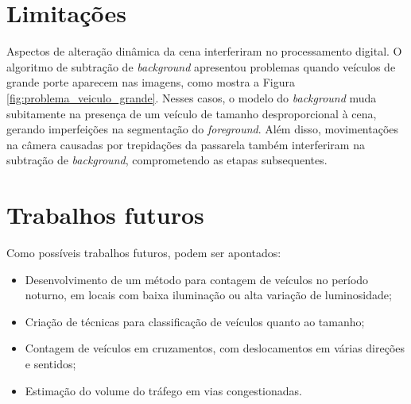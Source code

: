 
\section{Limitações} %
\label{sec:pontos_negativos_do_m_todo}

Aspectos de alteração dinâmica da cena interferiram no processamento digital. O algoritmo de subtração de \textit{background} apresentou problemas quando veículos de grande porte aparecem nas imagens, como mostra a Figura \ref{fig:problema_veiculo_grande}. Nesses casos, o modelo do \textit{background} muda subitamente na presença de um veículo de tamanho desproporcional à cena, gerando imperfeições na segmentação do \textit{foreground}. Além disso, movimentações na câmera causadas por trepidações da passarela também interferiram na subtração de \textit{background}, comprometendo as etapas subsequentes.



\section{Trabalhos futuros} %

Como possíveis trabalhos futuros, podem ser apontados:

\begin{itemize}
  \item Desenvolvimento de um método para contagem de veículos no período noturno, em locais com baixa iluminação ou alta variação de luminosidade;
  \item Criação de técnicas para classificação de veículos quanto ao tamanho;
  \item Contagem de veículos em cruzamentos, com deslocamentos em várias direções e sentidos;
  \item Estimação do volume do tráfego em vias congestionadas.
\end{itemize}

\label{sec:trabalhos_futuros}

